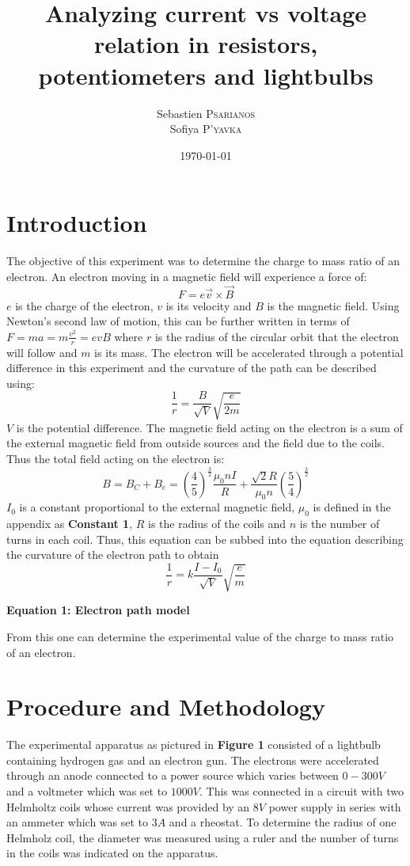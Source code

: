 \documentclass[
	letterpaper, %
	10pt, %
]{CSUniSchoolLabReport}
\title{Analyzing current vs voltage relation in resistors, potentiometers and lightbulbs}
\author{Sebastien \textsc{Psarianos}\\ Sofiya \textsc{P'yavka}}
\date{\today}
\begin{document}
\setlength\arrayrulewidth{2pt}

\maketitle

\section{Introduction}
The objective of this experiment was to determine the charge to mass ratio of an
electron. An electron moving in a magnetic field will experience a force of:
$$F=e\vec v\times \vec B$$
$e$ is the charge of the electron, $v$ is its velocity and $B$ is the magnetic field.
Using Newton’s second law of motion, this can be further written in terms of $F = ma = m\frac{v^2}{r}=evB$ where $r$ is the radius of
the circular orbit that the electron will follow and $m$ is its mass. The electron will
be accelerated through a potential difference in this experiment and the curvature
of the path can be described using:
$$\frac{1}{r}= \frac{B}{\sqrt V}\sqrt{\frac{e}{2m}}$$
$V$ is the potential difference. The magnetic field acting on the electron is a
sum of the external magnetic field from outside sources and the field due to the
coils. Thus the total field acting on the electron is:
$$B=B_C+B_e = \left(\frac{4}{5}\right)^{\frac{3}{2}} \frac{\mu_0nI}{R} + \frac{\sqrt 2 R }{\mu_0n}\left(\frac{5}{4}\right)^{\frac{3}{2}}$$
$I_0$ is a constant proportional to the external magnetic field, $\mu_0$ is defined in the appendix as \textbf{Constant 1},
$R$ is the radius of the coils and $n$ is the number of turns in each coil. Thus, this
equation can be subbed into the equation describing the curvature of the electron path to obtain
$$\frac{1}{r}=k\frac{I-I_0}{\sqrt V}\sqrt{\frac{e}{m}}$$
\begin{center}
	\textbf{Equation 1: Electron path model}
\end{center}
From this one can determine the experimental value of the charge to mass ratio of an electron.
\section{Procedure and Methodology}
The experimental apparatus as pictured in \textbf{Figure 1} consisted of a lightbulb containing hydrogen gas
and an electron gun. The electrons were accelerated through an anode connected to a power source
which varies between $0-300 V$ and a voltmeter which was set to $1000 V$. This was connected in a circuit
with two Helmholtz coils whose current was provided by an $8V$ power supply in series with an ammeter
which was set to $3 A$ and a rheostat. To determine the radius of one Helmholz coil, the diameter was
measured using a ruler and the number of turns in the coils was indicated on the apparatus.\\
\end{document}

